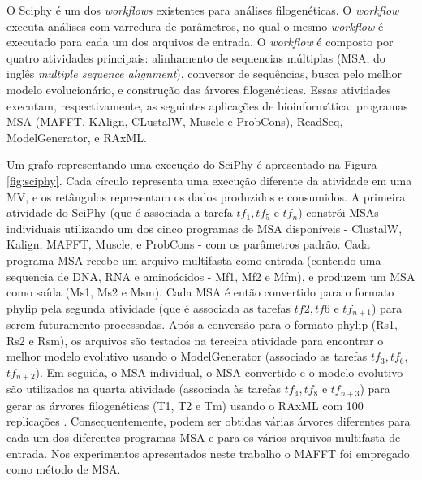 O Sciphy \cite{ocana2011} é um dos \textit{workflows} existentes para análises filogenéticas. O \textit{workflow} executa análises com varredura de parâmetros, no qual o mesmo \textit{workflow} é executado para cada um dos arquivos de entrada. O \textit{workflow} é composto por quatro atividades principais: alinhamento de sequencias múltiplas (MSA, do inglês \textit{multiple sequence alignment}), conversor de sequências, busca pelo melhor modelo evolucionário, e construção das árvores filogenéticas. Essas atividades executam, respectivamente, as seguintes aplicações de bioinformática: programas MSA (MAFFT, KAlign, CLustalW, Muscle e ProbCons), ReadSeq, ModelGenerator, e RAxML.


Um grafo representando uma execução do SciPhy é apresentado na Figura \ref{fig:sciphy}. Cada círculo representa uma execução diferente da atividade em uma MV, e os retângulos representam os dados produzidos e consumidos.  A primeira atividade do SciPhy (que é associada a tarefa $tf_1, tf_5$ e $tf_n$) constrói MSAs individuais utilizando um dos cinco programas de MSA disponíveis - ClustalW, Kalign, MAFFT, Muscle, e ProbCons - com os parâmetros padrão. Cada programa MSA recebe um arquivo multifasta como entrada (contendo uma sequencia de DNA, RNA e aminoácidos - Mf1, Mf2 e Mfm), e produzem um MSA como saída (Ms1, Ms2 e Msm). Cada MSA é então convertido para o formato phylip pela segunda atividade (que é associada as tarefas $tf2, tf6$ e $tf_{n+1}$) para serem futuramento processadas. Após a conversão para o formato phylip (Rs1, Rs2 e Rsm), os arquivos são testados na terceira atividade para encontrar o melhor modelo evolutivo usando o ModelGenerator (associado as tarefas $tf_3, tf_6$, $tf_{n+2}$). Em seguida, o MSA individual, o MSA convertido e o modelo evolutivo são utilizados na quarta atividade (associada às tarefas $tf_4, tf_8$ e $tf_{n+3}$) para gerar as árvores filogenéticas (T1, T2 e Tm) usando o RAxML com 100 replicações \cite{raxml}. Consequentemente, podem ser obtidas várias árvores diferentes para cada um dos diferentes programas MSA e para os vários arquivos multifasta de entrada. Nos experimentos apresentados neste trabalho o MAFFT foi empregado como método de MSA.

